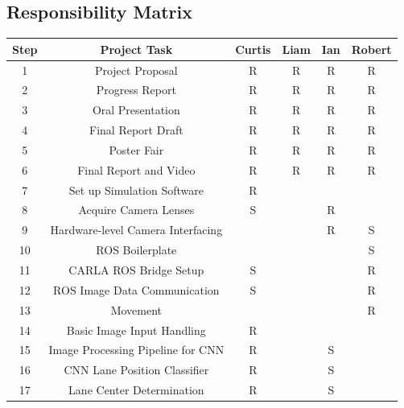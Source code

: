 \documentclass[titlepage]{article}
\begin{document}
\subsection{Responsibility Matrix}
\begin{center}
	\begin{tabular}{|c | c | c | c | c | c |}
		\hline
		Step & Project Task                      & Curtis & Liam & Ian & Robert \\ [0.5ex]
		\hline
		1    & Project Proposal                  & R      & R    & R   & R      \\
		\hline
		2    & Progress Report                   & R      & R    & R   & R      \\
		\hline
		3    & Oral Presentation                 & R      & R    & R   & R      \\
		\hline
		4    & Final Report Draft                & R      & R    & R   & R      \\
		\hline
		5    & Poster Fair                       & R      & R    & R   & R      \\
		\hline
		6    & Final Report and Video            & R      & R    & R   & R      \\
		\hline
		7    & Set up Simulation Software        & R      &      &     &        \\
		\hline
		8    & Acquire Camera Lenses             & S      &      & R   &        \\
		\hline
		9    & Hardware-level Camera Interfacing &        &      & R   & S      \\
		\hline
		10   & ROS Boilerplate                   &        &      &     & S      \\
		\hline
		11   & CARLA ROS Bridge Setup            & S      &      &     & R      \\
		\hline
		12   & ROS Image Data Communication      & S      &      &     & R      \\
		\hline
		13   & Movement                          &        &      &     & R      \\
		\hline
		14   & Basic Image Input Handling        & R      &      &     &        \\
		\hline
		15   & Image Processing Pipeline for CNN & R      &      & S   &        \\
		\hline
		16   & CNN Lane Position Classifier      & R      &      & S   &        \\
		\hline
		17   & Lane Center Determination         & R      &      & S   &        \\

\end{tabular}
\end{center}
\end{document}
